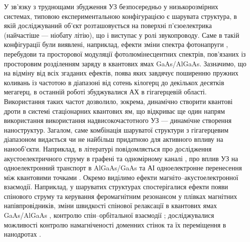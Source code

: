 У зв'язку з труднощами збудження УЗ безпосередньо у низькорозмірних системах, типовою
експериментальною конфігурацією є шарувата структура, в якій досліджуваний об'єкт розташовується на поверхні п'єзоелектрика (найчастіше --- ніобату літію), що і виступає у ролі звукопроводу.
Саме в такій конфігурації були виявлені, наприклад, ефекти зміни спектра фотонапруги \cite{KurylJTF09}, перебудови \cite{Kuryliuk2009} та просторової модуляції \cite{US:PL:GaAs} фотолюмінесцентних спектрів, пов'язаних із просторовим розділенням заряду в квантових ямах  GaAs/AlGaAs.
Зазначимо, що на відміну від всіх згаданих ефектів, поява яких завдячує поширенню пружних коливань із частотою в діапазоні від сотень кілогерц до декількох десятків мегагерц,
в останній роботі збуджувалися АХ в гігагерцевій області.
Використання таких частот дозволило, зокрема, динамічно створити квантові дроти в системі стаціонарних квантових ям, що відкриває ще один напрям використання використання надвисокочастотного УЗ --- динамічне створення наноструктур.
Загалом, саме комбінація шаруватої структури з гігагерцевим діапазоном видається чи не найбільш придатною для активного впливу на нанооб'єкти.
Наприклад, в літературі повідомляється про дослідження акустоелектричного струму в графені \cite{US:graphen,US:grafen2,US:grafen3,US:grafen4} та одномірному каналі \cite{US:1D,NETO2016},
про вплив УЗ на одноелектронний транспорт в AlGaAs/GaAs \cite{US:single,US:single2} та
АІ одноелектронне перенесення між квантовими точками \cite{US:Nature}.
Окремо виділимо ефекти магніто--акустоелектронної взаємодії.
 Наприклад, у шаруватих структурах спостерігалися ефекти появи спінового струму \cite{PhysRevLett108:176601} та керування феромагнітним резонансом \cite{PhysRevB90:094401} у плівках магнітних напівпровідників,
зміни  швидкості спінової релаксації в квантових ямах GaAs/AlGaAs \cite{PhysRevB78:153305},
контролю спін--орбітальної взаємодії \cite{Sanada:2011};
досліджувалися можливості контролю намагніченості доменних стінок \cite{LI2014} та їх переміщення в нанодротах \cite{US:nanowire}.



